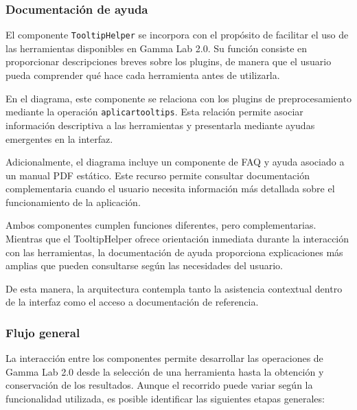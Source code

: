 \documentclass[11pt,a4paper]{article}
\DeclareRobustCommand{\_}{\textunderscore\allowbreak}
\begin{document}
\subsubsection{Documentación de ayuda}

El componente \texttt{TooltipHelper} se incorpora con el propósito de facilitar el uso de las herramientas disponibles en Gamma Lab 2.0. Su función consiste en proporcionar descripciones breves sobre los plugins, de manera que el usuario pueda comprender qué hace cada herramienta antes de utilizarla.

En el diagrama, este componente se relaciona con los plugins de preprocesamiento mediante la operación \texttt{aplicar\_tooltips}. Esta relación permite asociar información descriptiva a las herramientas y presentarla mediante ayudas emergentes en la interfaz.

Adicionalmente, el diagrama incluye un componente de FAQ y ayuda asociado a un manual PDF estático. Este recurso permite consultar documentación complementaria cuando el usuario necesita información más detallada sobre el funcionamiento de la aplicación.

Ambos componentes cumplen funciones diferentes, pero complementarias. Mientras que el TooltipHelper ofrece orientación inmediata durante la interacción con las herramientas, la documentación de ayuda proporciona explicaciones más amplias que pueden consultarse según las necesidades del usuario.

De esta manera, la arquitectura contempla tanto la asistencia contextual dentro de la interfaz como el acceso a documentación de referencia.

\subsubsection{Flujo general}

La interacción entre los componentes permite desarrollar las operaciones de Gamma Lab 2.0 desde la selección de una herramienta hasta la obtención y conservación de los resultados. Aunque el recorrido puede variar según la funcionalidad utilizada, es posible identificar las siguientes etapas generales:
\end{document}
